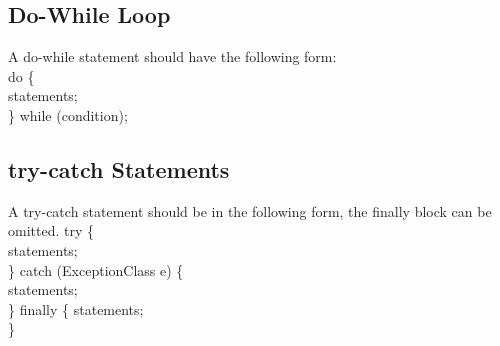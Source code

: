 \documentclass[a4paper,12pt]{report}
\begin{document}
\subsection{Do-While Loop}
A do-while statement should have the following form:\\
do \{ \\
	\indent statements; \\
\} while (condition); 
\subsection{try-catch Statements}
A try-catch statement should be in the following form, the finally block can be omitted. 
try \{ \\
	\indent statements;\\
\} catch (ExceptionClass e) \{ \\
	\indent statements;\\
\} finally \{
	\indent statements;\\
\}
\end{document}
